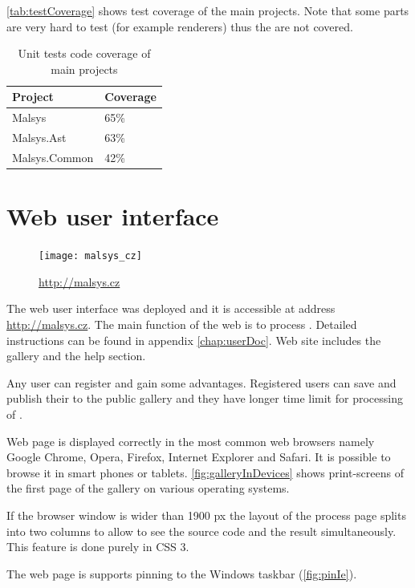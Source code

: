 \autoref{tab:testCoverage} shows test coverage of the main projects.
Note that some parts are very hard to test (for example \lsystem renderers) thus the are not covered.

\begin{table}[h]
	\centering
	\begin{tabular}{l l}
   		\toprule
   		Project & Coverage\\
   		\midrule
		Malsys & 65\% \\ \hline
		Malsys.Ast & 63\% \\ \hline
		Malsys.Common & 42\% \\
		\bottomrule
	\end{tabular}
	\caption{Unit tests code coverage of main projects}
	\label{tab:testCoverage}
\end{table}


\clearpage %
\section{Web user interface}

\begin{figure}
	\texttt{[image: malsys\_cz]}
	\caption[QR code for http://malsys.cz]{\url{http://malsys.cz}}
	\label{fig:malsysQr}
\end{figure}

The web user interface was deployed and it is accessible at address \url{http://malsys.cz}.
The main function of the web is to process \lsystems.
Detailed instructions can be found in appendix \ref{chap:userDoc}.
Web site includes the \lsystem gallery and the help section.

Any user can register and gain some advantages.
Registered users can save and publish their \lsystems to the public gallery and they have longer time limit for processing of \lsystems.

Web page is displayed correctly in the most common web browsers namely Google Chrome, Opera, Firefox, Internet Explorer and Safari.
It is possible to browse it in smart phones or tablets.
\autoref{fig:galleryInDevices} shows print-screens of the first page of the gallery on various operating systems.

If the browser window is wider than 1900 px the layout of the \lsystem process page splits into two columns to allow to see the source code and the result simultaneously.
This feature is done purely in CSS 3.

The web page is supports pinning to the Windows taskbar (\autoref{fig:pinIe}). 


